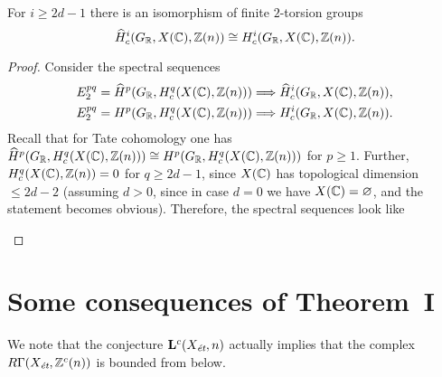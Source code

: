 \documentclass{article}
\numberwithin{equation}{section}
\begin{document}
\begin{lemma}
  \label{lemma:Tate-vs-normal-cohomology-of-X(C)}
  For $i \ge 2d - 1$ there is an isomorphism of finite $2$-torsion groups
  \[ \widehat{H}^i_c (G_\RR, X (\CC), \ZZ(n)) \cong
    H^i_c (G_\RR, X (\CC), \ZZ(n)). \]

  \begin{proof}
    Consider the spectral sequences
    \begin{align*}
      E^{pq}_2 = \widehat{H}^p (G_\RR, H^q_c (X (\CC), \ZZ(n))) & \Longrightarrow
      \widehat{H}^i_c (G_\RR, X (\CC), \ZZ(n)), \\
      E^{pq}_2 = H^p (G_\RR, H^q_c (X (\CC), \ZZ(n))) & \Longrightarrow
      H^i_c (G_\RR, X (\CC), \ZZ(n)).
    \end{align*}
    Recall that for Tate cohomology one has
    $\widehat{H}^p (G_\RR, H^q_c (X (\CC), \ZZ(n))) \cong
    H^p (G_\RR, H^q_c (X (\CC), \ZZ(n)))$ for $p \ge 1$.
    Further, $H^q_c (X (\CC), \ZZ(n)) = 0$
    for $q \ge 2d-1$, since $X (\CC)$ has topological dimension $\le 2d - 2$
    (assuming $d > 0$, since in case $d = 0$ we have $X (\CC) = \emptyset$, and
    the statement becomes obvious).  Therefore, the spectral sequences look like
    \begin{center}
    \end{center}
  \end{proof}
\end{lemma}


\section{Some consequences of Theorem~I}
\label{sec:consequences-of-theorem-I}

We note that the conjecture $\mathbf{L}^c (X_\et, n)$ actually implies that the
complex $R\Gamma (X_\et, \ZZ^c (n))$ is bounded from below.
\end{document}
